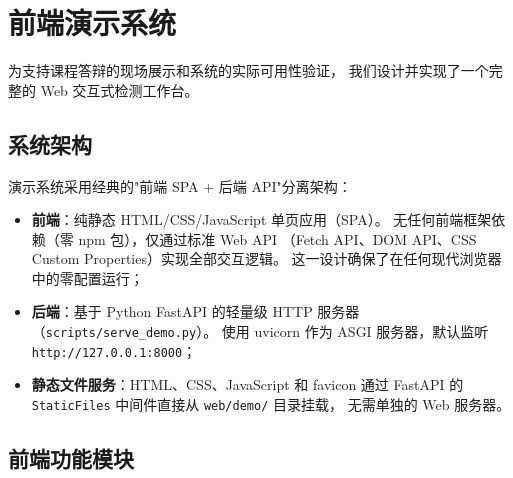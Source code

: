 \documentclass[11pt,a4paper]{ctexart}
\begin{document}
\section{前端演示系统}

为支持课程答辩的现场展示和系统的实际可用性验证，
我们设计并实现了一个完整的 Web 交互式检测工作台。

\subsection{系统架构}

演示系统采用经典的"前端 SPA + 后端 API"分离架构：

\begin{itemize}
  \item \textbf{前端}：纯静态 HTML/CSS/JavaScript 单页应用（SPA）。
  无任何前端框架依赖（零 npm 包），仅通过标准 Web API
  （Fetch API、DOM API、CSS Custom Properties）实现全部交互逻辑。
  这一设计确保了在任何现代浏览器中的零配置运行；
  \item \textbf{后端}：基于 Python FastAPI 的轻量级 HTTP 服务器（\texttt{scripts/serve\_demo.py}）。
  使用 uvicorn 作为 ASGI 服务器，默认监听 \texttt{http://127.0.0.1:8000}；
  \item \textbf{静态文件服务}：HTML、CSS、JavaScript 和 favicon 通过 FastAPI 的
  \texttt{StaticFiles} 中间件直接从 \texttt{web/demo/} 目录挂载，
  无需单独的 Web 服务器。
\end{itemize}

\subsection{前端功能模块}
\end{document}
